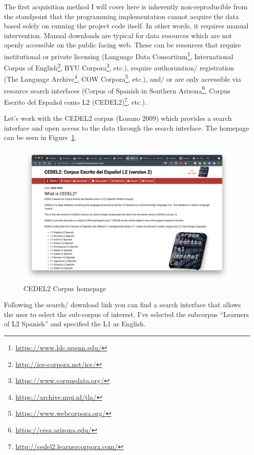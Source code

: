 \documentclass[
  letterpaper,
]{scrbook}
\DeclareRobustCommand{\href}[2]{#2\footnote{\url{#1}}}
\begin{document}
The first acquisition method I will cover here is inherently
non-reproducible from the standpoint that the programming implementation
cannot acquire the data based solely on running the project code itself.
In other words, it requires manual intervention. Manual downloads are
typical for data resources which are not openly accessible on the public
facing web. These can be resources that require institutional or private
licensing (\href{https://www.ldc.upenn.edu/}{Language Data Consortium},
\href{http://ice-corpora.net/ice/}{International Corpus of English},
\href{https://www.corpusdata.org/}{BYU Corpora}, etc.), require
authorization/ registration (\href{https://archive.mpi.nl/tla/}{The
Language Archive}, \href{https://www.webcorpora.org/}{COW Corpora},
etc.), and/ or are only accessible via resource search interfaces
(\href{https://cesa.arizona.edu/}{Corpus of Spanish in Southern
Arizona}, \href{http://cedel2.learnercorpora.com/}{Corpus Escrito del
Español como L2 (CEDEL2)}, etc.).

Let's work with the CEDEL2 corpus (Lozano 2009) which provides a search
interface and open access to the data through the search interface. The
homepage can be seen in Figure~\ref{fig-ad-show-page-cedel2-1}.

\begin{figure}[h]

{\centering \includegraphics[width=9.28in,height=\textheight]{./figures/acquire-data/ad-cedel2-site.png}

}

\caption{\label{fig-ad-show-page-cedel2-1}CEDEL2 Corpus homepage}

\end{figure}

Following the search/ download link you can find a search interface that
allows the user to select the sub-corpus of interest. I've selected the
subcorpus ``Learners of L2 Spanish'' and specified the L1 as English.
\end{document}
